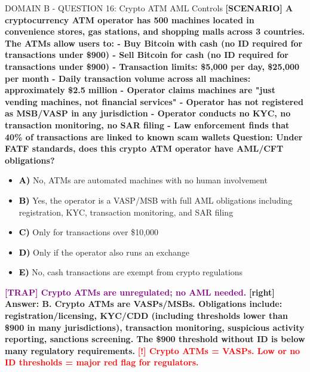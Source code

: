 \documentclass[11pt,a4paper]{beamer}
\newcommand{\redflag}[1]{\textcolor{red}{\textbf{[!] #1}}}
\newcommand{\trap}[1]{\textcolor{purple}{\textbf{[TRAP] #1}}}
\newcommand{\correct}[1]{\textcolor{green!50!black}{\textbf{[right] #1}}}
\newcommand{\scenario}[1]{\textcolor{blue!70!black}{\textbf{[SCENARIO] #1}}}
\newcommand{\option}[1]{\textcolor{black}{\textbf{#1}}}
\begin{document}
\begin{frame}{DOMAIN B - QUESTION 16: Crypto ATM AML Controls}
\scenario{A cryptocurrency ATM operator has 500 machines located in convenience stores, gas stations, and shopping malls across 3 countries. The ATMs allow users to:
- Buy Bitcoin with cash (no ID required for transactions under \$900)
- Sell Bitcoin for cash (no ID required for transactions under \$900)
- Transaction limits: \$5,000 per day, \$25,000 per month
- Daily transaction volume across all machines: approximately \$2.5 million
- Operator claims machines are "just vending machines, not financial services"
- Operator has not registered as MSB/VASP in any jurisdiction
- Operator conducts no KYC, no transaction monitoring, no SAR filing
- Law enforcement finds that 40\% of transactions are linked to known scam wallets}
\vspace{0.2cm}
\textbf{Question: Under FATF standards, does this crypto ATM operator have AML/CFT obligations?}
\vspace{0.1cm}
\begin{itemize}
    \item \option{A)} No, ATMs are automated machines with no human involvement
    \item \option{B)} Yes, the operator is a VASP/MSB with full AML obligations including registration, KYC, transaction monitoring, and SAR filing
    \item \option{C)} Only for transactions over \$10,000
    \item \option{D)} Only if the operator also runs an exchange
    \item \option{E)} No, cash transactions are exempt from crypto regulations
\end{itemize}
\vspace{0.2cm}
\trap{Crypto ATMs are unregulated; no AML needed.}
\correct{Answer: B. Crypto ATMs are VASPs/MSBs. Obligations include: registration/licensing, KYC/CDD (including thresholds lower than \$900 in many jurisdictions), transaction monitoring, suspicious activity reporting, sanctions screening. The \$900 threshold without ID is below many regulatory requirements.}
\redflag{Crypto ATMs = VASPs. Low or no ID thresholds = major red flag for regulators.}
\end{frame}
\end{document}
